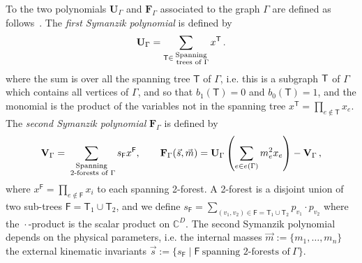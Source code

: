 \documentclass[a4paper,12pt]{article}
\numberwithin{equation}{section}
\numberwithin{figure}{subsection}
\theoremstyle{plain}
\theoremstyle{plain}
\theoremstyle{definition}
\theoremstyle{plain}
\theoremstyle{remark}
\theoremstyle{plain}
\begin{document}
To the two polynomials $\textbf{U}_\Gamma$ and $\textbf{F}_\Gamma$
associated to the graph $\Gamma$ are defined as
follows~\cite{nakanishi1971graph,Weinzierl:2022eaz}.  The {\em first
  Symanzik polynomial} is defined by
\begin{equation}\label{e:Udef}
{\bf U}_\Gamma = \sum_{\mathsf{T} \in \substack{ \text{Spanning} \\ \text{ trees of } \Gamma}} x^{\mathsf{T}}\,.
\end{equation}
where the sum is over all the spanning tree $\mathsf{T}$ of $\Gamma$,
i.e.  this is a subgraph ${\sf T}$ of $\Gamma$ which contains all
vertices of $\Gamma$, and so that $b_1(\mathsf{T}) =0$ and
$b_0(\mathsf{T})=1$, and the
monomial is the product of the variables not in the spanning tree
$x^{\mathsf{T}} = \prod_{e\notin {\mathsf{T}}} x_e$. 
The {\em second 
  Symanzik polynomial}  $\textbf{F}_\Gamma$ is defined by
\begin{equation}\label{e:VFdef}
{\bf V}_{\Gamma} = \sum_{\substack{ \text{Spanning} \\ \text{ 2-forests
      of } \Gamma}}s_{\mathsf{F}} x^{\mathsf{F}}  ,\qquad {\bf F}_{\Gamma}(\vec{s}, \vec{m}) = {\bf U}_\Gamma\left( \sum_{e \in e(\Gamma)} m_e^2 x_e\right) - {\bf V}_{\Gamma}\,,
\end{equation}
where $x^{\mathsf{F}} =
\prod_{e \notin \mathsf{F}} x_i$ to each spanning 2-forest. A 2-forest
is a disjoint union of two sub-trees $\mathsf{F}=\mathsf{T}_1\cup \mathsf{T}_2$,  and we define $s_\mathsf{F} = \sum_{(v_1,v_2) \in \mathsf{F}=\mathsf{T}_1\cup \mathsf{T}_2} p_{v_1}\cdot p_{v_2}$ where the ${}\cdot{}$-product is the
scalar product on $\mathbb {C}^{D}$.
The second Symanzik polynomial depends on the physical parameters,
i.e. the
internal masses $\vec m:=\{m_1,\dots,m_n\}$ the external kinematic invariants
$\vec s:=\{s_\textsf{F} \mid \textsf{F} ~ \textrm{spanning
2-forests of}~\Gamma\}$.
\end{document}
